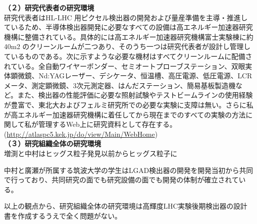 	\noindent
	\textbf{（２）研究代表者の研究環境}\\
研究代表者はHL-LHC 用ピクセル検出器の開発および量産準備を主導・推進しているため、半導体検出器開発に必要なすべての設備は高エネルギー加速器研究機構に整備されている。具体的には高エネルギー加速器研究機構富士実験棟に約40m2 のクリーンルームが二つあり、そのうち一つは研究代表者が設計し管理しているものである。次に示すような必要な機材はすべてクリーンルームに配備されている。全自動ワイヤーボンダー、セミオートプローブステーション、双眼実体顕微鏡、Nd:YAGレーザー、デシケータ、恒温槽、高圧電源、低圧電源、LCRメータ、測定顕微鏡、3次元測定器、はんだステーション、簡易基板製造機など。また、検出器の性能評価に必要な照射試験やテストビームラインの使用経験が豊富で、東北大およびフェルミ研究所での必要な実験に支障は無い。さらに私が高エネルギー加速器研究機構に着任してから現在までのすべての実験の方法に関して私が管理するWeb上に研究資料として存在する。(\url{http://atlaspc5.kek.jp/do/view/Main/WebHome})
\\

	\noindent
	\textbf{（３）研究組織全体の研究環境}\\

増渕と中村はヒッグス粒子発見以前からヒッグス粒子に

中村と廣瀬が所属する筑波大学の学生はLGAD検出器の開発を開発当初から共同で行っており、共同研究の面でも研究設備の面でも開発の体制が確立されている。

以上の観点から、研究組織全体の研究環境は高輝度LHC実験後期検出器の設計書を作成するうえで全く問題がない。


